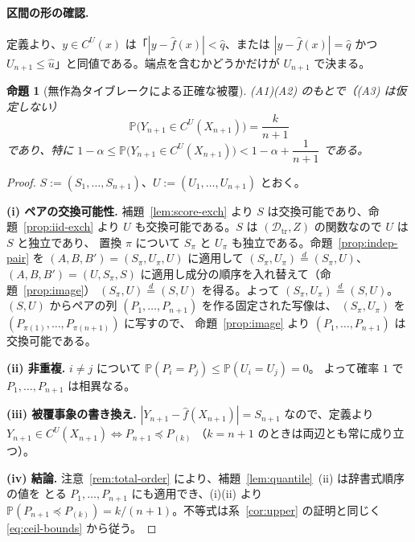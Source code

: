 \documentclass[a4paper,11pt]{jsarticle}
\theoremstyle{definition}
\theoremstyle{plain}
\newtheorem{proposition}[definition]{命題}
\theoremstyle{remark}
\newcommand{\Prob}{\mathbb{P}}
\newcommand{\eqd}{\overset{d}{=}}               %
\newcommand{\Dtr}{\mathcal{D}_{\mathrm{tr}}}     %
\newcommand{\qhat}{\hat{q}}
\newcommand{\fhat}{\hat{f}}
\begin{document}
\paragraph{区間の形の確認.}
定義より、$y\in C^U(x)$ は「$|y-\fhat(x)|<\qhat$、または $|y-\fhat(x)|=\qhat$ かつ
$U_{n+1}\le\hat u$」と同値である。端点を含むかどうかだけが $U_{n+1}$ で決まる。

\begin{proposition}[無作為タイブレークによる正確な被覆]
  \label{prop:random-tiebreak}
  (A1)(A2) のもとで（(A3) は仮定しない）
  \begin{equation*}
    \Prob\bigl(Y_{n+1}\in C^U(X_{n+1})\bigr)=\frac{k}{n+1}
  \end{equation*}
  であり、特に
  $1-\alpha\le\Prob\bigl(Y_{n+1}\in C^U(X_{n+1})\bigr)<1-\alpha+\dfrac{1}{n+1}$ である。
\end{proposition}

\begin{proof}
  $S:=(S_1,\dots,S_{n+1})$、$U:=(U_1,\dots,U_{n+1})$ とおく。

  \textbf{(i) ペアの交換可能性.}
  補題~\ref{lem:score-exch} より $S$ は交換可能であり、命題~\ref{prop:iid-exch} より
  $U$ も交換可能である。$S$ は $(\Dtr,Z)$ の関数なので $U$ は $S$ と独立であり、
  置換 $\pi$ について $S_\pi$ と $U_\pi$ も独立である。命題~\ref{prop:indep-pair} を
  $(A,B,B')=(S_\pi,U_\pi,U)$ に適用して $(S_\pi,U_\pi)\eqd(S_\pi,U)$、
  $(A,B,B')=(U,S_\pi,S)$ に適用し成分の順序を入れ替えて（命題~\ref{prop:image}）
  $(S_\pi,U)\eqd(S,U)$ を得る。よって $(S_\pi,U_\pi)\eqd(S,U)$。
  $(S,U)$ からペアの列 $(P_1,\dots,P_{n+1})$ を作る固定された写像は、
  $(S_\pi,U_\pi)$ を $(P_{\pi(1)},\dots,P_{\pi(n+1)})$ に写すので、
  命題~\ref{prop:image} より $(P_1,\dots,P_{n+1})$ は交換可能である。

  \textbf{(ii) 非重複.}
  $i\ne j$ について $\Prob(P_i=P_j)\le\Prob(U_i=U_j)=0$。
  よって確率 $1$ で $P_1,\dots,P_{n+1}$ は相異なる。

  \textbf{(iii) 被覆事象の書き換え.}
  $|Y_{n+1}-\fhat(X_{n+1})|=S_{n+1}$ なので、定義より
  $Y_{n+1}\in C^U(X_{n+1})\iff P_{n+1}\preceq P_{(k)}$
  （$k=n+1$ のときは両辺とも常に成り立つ）。

  \textbf{(iv) 結論.}
  注意~\ref{rem:total-order} により、補題~\ref{lem:quantile}~(ii) は辞書式順序の値を
  とる $P_1,\dots,P_{n+1}$ にも適用でき、(i)(ii) より
  $\Prob(P_{n+1}\preceq P_{(k)})=k/(n+1)$。不等式は系~\ref{cor:upper} の証明と同じく
  \eqref{eq:ceil-bounds} から従う。
\end{proof}
\end{document}
